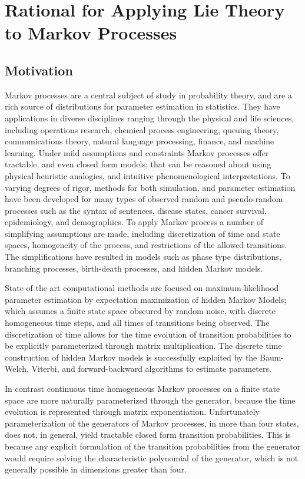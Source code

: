 \chapter{Rational for Applying Lie Theory to Markov Processes}
\section{Motivation}
Markov processes are a central subject of study in probability theory, and are a rich source
of distributions for parameter estimation in statistics\cite{billingsley_probability_1995,rogers_diffusions_2000,rogers_diffusions_2000-1}.
They have applications in diverse disciplines ranging through the physical and life
sciences, including operations research, chemical process engineering, queuing theory,
communications theory, natural language processing, finance, and machine learning. Under
mild assumptions and constraints Markov processes offer tractable, and even closed form 
models; that can be reasoned about using physical heuristic analogies, and intuitive
phenomenological interpretations. To varying degrees of rigor, methods for both simulation,
and parameter estimation have been developed for many types of observed random and
pseudo-random processes such as the syntax of sentences, disease states, cancer survival,
epidemiology, and demographics. To apply Markov process a number of simplifying assumptions
are made, including discretization of time and state spaces, homogeneity of the process, and
restrictions of the allowed transitions. The simplifications have resulted in models such as
phase type distributions, branching processes, birth-death processes, and hidden Markov
models.

State of the art computational methods are focused on maximum likelihood parameter
estimation by expectation maximization of hidden Markov Models; which assumes a finite state
space obscured by random noise, with discrete homogeneous time steps, and all times of
transitions being observed. The discretization of time allows for the time evolution of
transition probabilities to be explicitly parameterized through matrix multiplication. The
discrete time construction of hidden Markov models is successfully exploited by the
Baum-Welch, Viterbi, and forward-backward algorithms to estimate parameters.

In contrast continuous time homogeneous Markov processes on a finite state space are more
naturally parameterized through the generator, because the time evolution is represented
through matrix exponentiation. Unfortunately parameterization of the generators of Markov
processes, in more than four states, does not, in general, yield tractable closed form
transition probabilities. This is because any explicit formulation of the transition
probabilities from the generator would require solving the characteristic polynomial of the
generator, which is not generally possible in dimensions greater than four. 

